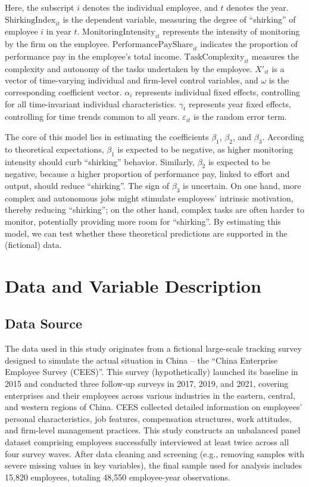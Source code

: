\noindent
Here, the subscript \(i\) denotes the individual employee, and \(t\) denotes the year. \(\text{ShirkingIndex}_{it}\) is the dependent variable, measuring the degree of \enquote{shirking} of employee \(i\) in year \(t\). \(\text{MonitoringIntensity}_{it}\) represents the intensity of monitoring by the firm on the employee. \(\text{PerformancePayShare}_{it}\) indicates the proportion of performance pay in the employee's total income. \(\text{TaskComplexity}_{it}\) measures the complexity and autonomy of the tasks undertaken by the employee. \(X'_{it}\) is a vector of time-varying individual and firm-level control variables, and \(\omega\) is the corresponding coefficient vector. \(\alpha_i\) represents individual fixed effects, controlling for all time-invariant individual characteristics. \(\gamma_t\) represents year fixed effects, controlling for time trends common to all years. \(\varepsilon_{it}\) is the random error term.

The core of this model lies in estimating the coefficients \(\beta_1\), \(\beta_2\), and \(\beta_3\). According to theoretical expectations, \(\beta_1\) is expected to be negative, as higher monitoring intensity should curb \enquote{shirking} behavior. Similarly, \(\beta_2\) is expected to be negative, because a higher proportion of performance pay, linked to effort and output, should reduce \enquote{shirking}. The sign of \(\beta_3\) is uncertain. On one hand, more complex and autonomous jobs might stimulate employees' intrinsic motivation, thereby reducing \enquote{shirking}; on the other hand, complex tasks are often harder to monitor, potentially providing more room for \enquote{shirking}. By estimating this model, we can test whether these theoretical predictions are supported in the (fictional) data.

\section{Data and Variable Description}

\subsection{Data Source}

The data used in this study originates from a fictional large-scale tracking survey designed to simulate the actual situation in China – the \enquote{China Enterprise Employee Survey (CEES)}. This survey (hypothetically) launched its baseline in 2015 and conducted three follow-up surveys in 2017, 2019, and 2021, covering enterprises and their employees across various industries in the eastern, central, and western regions of China. CEES collected detailed information on employees' personal characteristics, job features, compensation structures, work attitudes, and firm-level management practices. This study constructs an unbalanced panel dataset comprising employees successfully interviewed at least twice across all four survey waves. After data cleaning and screening (e.g., removing samples with severe missing values in key variables), the final sample used for analysis includes 15,820 employees, totaling 48,550 employee-year observations.

